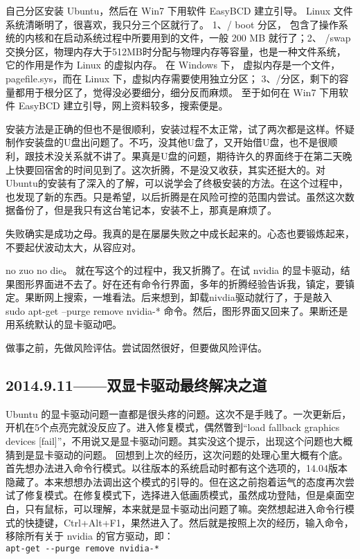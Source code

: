 \documentclass[cn,11pt,chinese,twoside]{elegantbook}
\begin{document}
自己分区安装 Ubuntu，然后在 Win7 下用软件 EasyBCD 建立引导。 Linux 文件系统清晰明了，很喜欢，我只分三个区就行了。 1、/ boot 分区， 包含了操作系统的内核和在启动系统过程中所要用到的文件，一般 200 MB 就行了；2、 /swap 交换分区，物理内存大于512MB时分配与物理内存等容量，也是一种文件系统，它的作用是作为 Linux 的虚拟内存。 在 Windows 下， 虚拟内存是一个文件， pagefile.sys，而在 Linux 下，虚拟内存需要使用独立分区； 3、/分区，剩下的容量都用于根分区了，觉得没必要细分，细分反而麻烦。 至于如何在 Win7 下用软件 EasyBCD 建立引导，网上资料较多，搜索便是。

安装方法是正确的但也不是很顺利，安装过程不太正常，试了两次都是这样。怀疑制作安装盘的U盘出问题了。不巧，没其他U盘了，又开始借U盘，也不是很顺利，跟技术没关系就不讲了。果真是U盘的问题，期待许久的界面终于在第二天晚上快要回宿舍的时间见到了。这次折腾，不是没又收获，其实还挺大的。对Ubuntu的安装有了深入的了解，可以说学会了终极安装的方法。在这个过程中，也发现了新的东西。只是希望，以后折腾是在风险可控的范围内尝试。虽然这次数据备份了，但是我只有这台笔记本，安装不上，那真是麻烦了。

失败确实是成功之母。我真的是在屡屡失败之中成长起来的。心态也要锻炼起来，不要起伏波动太大，从容应对。

no zuo no die。 就在写这个的过程中，我又折腾了。在试 nvidia 的显卡驱动，结果图形界面进不去了。好在还有命令行界面，多年的折腾经验告诉我，镇定，要镇定。果断网上搜索，一堆看法。后来想到，卸载nivdia驱动就行了，于是敲入
sudo apt-get --purge remove nvidia-*
 命令。然后，图形界面又回来了。果断还是用系统默认的显卡驱动吧。

做事之前，先做风险评估。尝试固然很好，但要做风险评估。



\subsection*{2014.9.11——双显卡驱动最终解决之道}
Ubuntu 的显卡驱动问题一直都是很头疼的问题。这次不是手贱了。一次更新后，开机在5个点亮完就没反应了。进入修复模式，偶然瞥到“load fallback graphics devices [fail]”，不用说又是显卡驱动问题。其实没这个提示，出现这个问题也大概猜到是显卡驱动的问题。 回想到上次的经历，这次问题的处理心里大概有个底。首先想办法进入命令行模式。以往版本的系统启动时都有这个选项的，14.04版本隐藏了。本来想想办法调出这个模式的引导的。但在这之前抱着运气的态度再次尝试了修复模式。在修复模式下，选择进入低画质模式，虽然成功登陆，但是桌面空白，只有鼠标，可以理解，本来就是显卡驱动出问题了嘛。突然想起进入命令行模式的快捷键，Ctrl+Alt+F1，果然进入了。然后就是按照上次的经历，输入命令，移除所有关于 nvidia 的官方驱动，即：\\
\verb|apt-get --purge remove nvidia-*|
\end{document}
